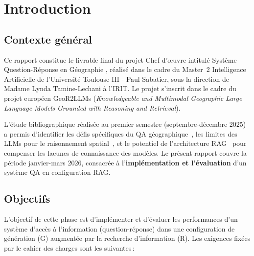 \documentclass[12pt,a4paper]{article}
\begin{document}
\newpage
\tableofcontents
\newpage

\section{Introduction}
\label{sec:introduction}

\subsection{Contexte g\'en\'eral}

Ce rapport constitue le livrable final du projet Chef d'\oe uvre intitul\'e \og Syst\`eme Question-R\'eponse en G\'eographie \fg, r\'ealis\'e dans le cadre du Master~2 Intelligence Artificielle de l'Universit\'e Toulouse III - Paul Sabatier, sous la direction de Madame Lynda Tamine-Lechani \`a l'IRIT. Le projet s'inscrit dans le cadre du projet europ\'een GeoR2LLMs (\textit{Knowledgeable and Multimodal Geographic Large Language Models Grounded with Reasoning and Retrieval}).

L'\'etude bibliographique r\'ealis\'ee au premier semestre (septembre-d\'ecembre 2025) a permis d'identifier les d\'efis sp\'ecifiques du QA g\'eographique~\cite{mai_geographic_2021}, les limites des LLMs pour le raisonnement spatial~\cite{cohn_evaluating_2024}, et le potentiel de l'architecture RAG~\cite{lewis2020retrieval, gao2023ragsurvey} pour compenser les lacunes de connaissance des mod\`eles. Le pr\'esent rapport couvre la p\'eriode janvier-mars 2026, consacr\'ee \`a l'\textbf{impl\'ementation et l'\'evaluation} d'un syst\`eme QA en configuration RAG.

\subsection{Objectifs}

L'objectif de cette phase est d'impl\'ementer et d'\'evaluer les performances d'un syst\`eme d'acc\`es \`a l'information (question-r\'eponse) dans une configuration de g\'en\'eration (G) augment\'ee par la recherche d'information (R). Les exigences fix\'ees par le cahier des charges sont les suivantes\,:
\end{document}

